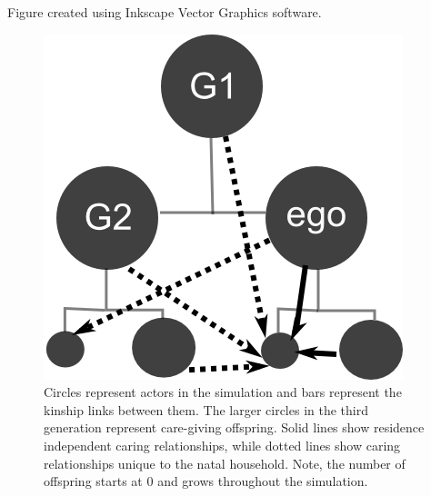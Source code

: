 \documentclass[10pt]{article}
\begin{document}
Figure created using Inkscape Vector Graphics software.

\begin{figure}[!ht]
  \includegraphics{Fig1.png}
\caption{Circles represent actors in the simulation and bars represent the kinship links between them.  The larger circles in the third generation represent care-giving offspring.  Solid lines show residence independent caring relationships, while dotted lines show caring relationships unique to the natal household.  Note, the number of offspring starts at 0 and grows throughout the simulation.}
\label{fig:kin_diag}       %

\end{figure} 
\end{document}
